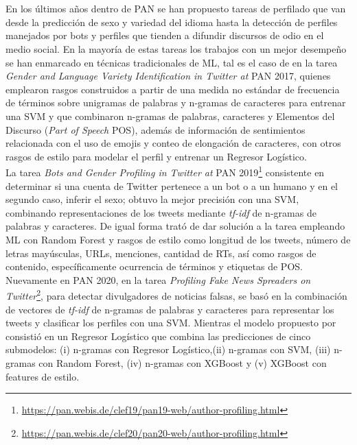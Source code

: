  \\
 \\
 En los últimos años dentro de PAN se han propuesto tareas de perfilado que van desde la predicción de sexo y variedad del idioma  hasta la detección de perfiles manejados por bots y perfiles que tienden a difundir discursos de odio en el medio social. En la mayoría de estas tareas los trabajos con un mejor desempeño se han enmarcado en técnicas tradicionales de ML, tal es el caso de \citep{basile:2017} en la tarea \textit{Gender and Language Variety Identification in Twitter at} PAN 2017, quienes emplearon rasgos construidos a partir de una medida no estándar de frecuencia de términos sobre unigramas de palabras y n-gramas de caracteres para entrenar una SVM y \citep{martinc:2017}  que combinaron n-gramas de palabras, caracteres y Elementos del Discurso (\textit{Part of Speech} POS), además de información de sentimientos relacionada con el uso de emojis y conteo de elongación de caracteres, con otros rasgos de estilo para modelar el perfil y entrenar un Regresor Logístico. 
 \\
 La tarea \textit{Bots and Gender Profiling in Twitter at} PAN 2019\footnote{\url{https://pan.webis.de/clef19/pan19-web/author-profiling.html}} consistente en determinar si una cuenta de Twitter pertenece a un bot o a un humano y en el segundo caso, inferir el sexo; \citep{DBLP:conf/clef/Pizarro19} obtuvo la mejor precisión con una SVM, combinando representaciones de los tweets mediante \textit{tf-idf} de n-gramas de palabras y caracteres. De igual forma \citep{DBLP:conf/clef/Johansson19} trató de dar solución a la tarea empleando ML con Random Forest y rasgos de estilo como longitud de los tweets, número de letras mayúsculas, URLs, menciones, cantidad de RTs, así como rasgos de contenido, específicamente ocurrencia de términos y etiquetas de POS.
 \\ 
 Nuevamente en PAN 2020, en la tarea \textit{Profiling Fake News Spreaders on Twitter}\footnote{\url{https://pan.webis.de/clef20/pan20-web/author-profiling.html}}, para detectar divulgadores de noticias falsas, \citep{pizarro:2020} se basó en la combinación de vectores de \textit{tf-idf} de n-gramas de palabras y caracteres para representar los tweets y clasificar los perfiles con una SVM. Mientras el modelo propuesto por \citep{buda:2020} consistió en un Regresor Logístico que combina las predicciones de cinco submodelos: (i) n-gramas con Regresor Logístico,(ii) n-gramas con SVM, (iii) n-gramas con Random Forest, (iv) n-gramas con XGBoost y (v) XGBoost con features de estilo.
